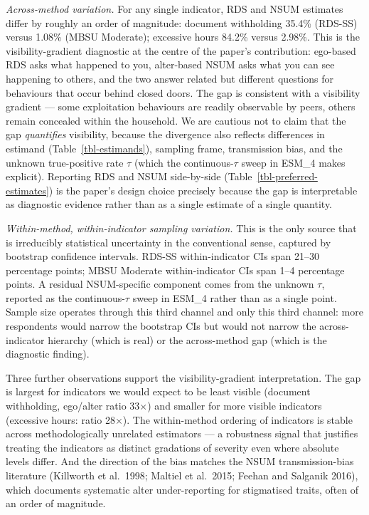 \documentclass[
  12pt,
  letterpaper,
  DIV=11,
  numbers=noendperiod]{scrartcl}
\begin{document}
\emph{Across-method variation.} For any single indicator, RDS and NSUM
estimates differ by roughly an order of magnitude: document withholding
35.4\% (RDS-SS) versus 1.08\% (MBSU Moderate); excessive hours 84.2\%
versus 2.98\%. This is the visibility-gradient diagnostic at the centre
of the paper's contribution: ego-based RDS asks what happened to you,
alter-based NSUM asks what you can see happening to others, and the two
answer related but different questions for behaviours that occur behind
closed doors. The gap is consistent with a visibility gradient --- some
exploitation behaviours are readily observable by peers, others remain
concealed within the household. We are cautious not to claim that the
gap \emph{quantifies} visibility, because the divergence also reflects
differences in estimand (Table~\ref{tbl-estimands}), sampling frame,
transmission bias, and the unknown true-positive rate \(\tau\) (which
the continuous-\(\tau\) sweep in ESM\_4 makes explicit). Reporting RDS
and NSUM side-by-side (Table~\ref{tbl-preferred-estimates}) is the
paper's design choice precisely because the gap is interpretable as
diagnostic evidence rather than as a single estimate of a single
quantity.

\emph{Within-method, within-indicator sampling variation.} This is the
only source that is irreducibly statistical uncertainty in the
conventional sense, captured by bootstrap confidence intervals. RDS-SS
within-indicator CIs span 21--30 percentage points; MBSU Moderate
within-indicator CIs span 1--4 percentage points. A residual
NSUM-specific component comes from the unknown \(\tau\), reported as the
continuous-\(\tau\) sweep in ESM\_4 rather than as a single point.
Sample size operates through this third channel and only this third
channel: more respondents would narrow the bootstrap CIs but would not
narrow the across-indicator hierarchy (which is real) or the
across-method gap (which is the diagnostic finding).

Three further observations support the visibility-gradient
interpretation. The gap is largest for indicators we would expect to be
least visible (document withholding, ego/alter ratio 33\(\times\)) and
smaller for more visible indicators (excessive hours: ratio
28\(\times\)). The within-method ordering of indicators is stable across
methodologically unrelated estimators --- a robustness signal that
justifies treating the indicators as distinct gradations of severity
even where absolute levels differ. And the direction of the bias matches
the NSUM transmission-bias literature (Killworth et al.~1998; Maltiel et
al.~2015; Feehan and Salganik 2016), which documents systematic alter
under-reporting for stigmatised traits, often of an order of magnitude.
\end{document}
